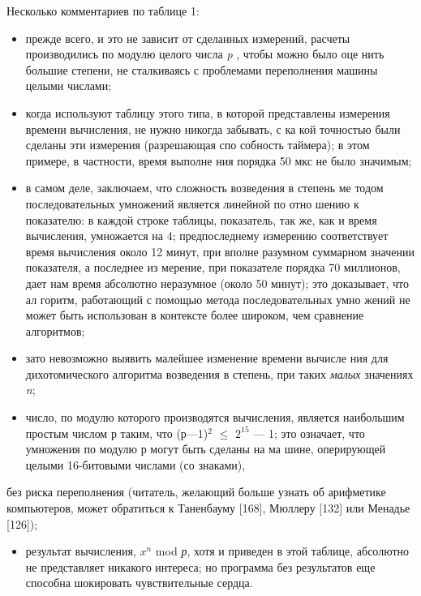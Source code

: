 \documentclass{mai_book}
\begin{document}
Несколько комментариев по таблице 1:
\begin{itemize}
\item прежде всего, и это не зависит от сделанных измерений, расчеты
производились по модулю целого числа {\it p} , чтобы можно было оце­
нить большие степени, не сталкиваясь с проблемами переполнения
машины целыми числами;
\item когда используют таблицу этого типа, в которой представлены
измерения времени вычисления, не нужно никогда забывать, с ка­
кой точностью были сделаны эти измерения (разрешающая спо­
собность таймера); в этом примере, в частности, время выполне­
ния порядка 50 мкс не было значимым;
\item в самом деле, заключаем, что сложность возведения в степень ме­
тодом последовательных умножений является линейной по отно­
шению к показателю: в каждой строке таблицы, показатель, так
же, как и время вычисления, умножается на 4; предпоследнему
измерению соответствует время вычисления около 12 минут, при
вполне разумном суммарном значении показателя, а последнее из­
мерение, при показателе порядка 70 миллионов, дает нам время
абсолютно неразумное (около 50 минут); это доказывает, что ал­
горитм, работающий с помощью метода последовательных умно­
жений не может быть использован в контексте более широком,
чем сравнение алгоритмов;
\item  зато невозможно выявить малейшее изменение времени вычисле­
ния для дихотомического алгоритма возведения в степень, при
таких {\it малых} значениях {\it n};
\item число, по модулю которого производятся вычисления, является
наибольшим простым числом р таким, что (р—1)$^2$ $\leqslant$ $2^{15}$ — 1; это
означает, что умножения по модулю р могут быть сделаны на ма­
шине, оперирующей целыми 16-битовыми числами (со знаками),
\end{itemize}
\newpage
\begin{center}
\parbox{12cm}{
без риска переполнения (читатель, желающий больше узнать об
арифметике компьютеров, может обратиться к Таненбауму [168],
Мюллеру [132] или Менадье [126]);}
\end{center}
\begin{itemize}
\item результат вычисления, $x^n$ mod {\it р}, хотя и приведен в этой таблице,
абсолютно не представляет никакого интереса; но программа без
результатов еще способна шокировать чувствительные сердца.
\end{itemize}
\end{document}
